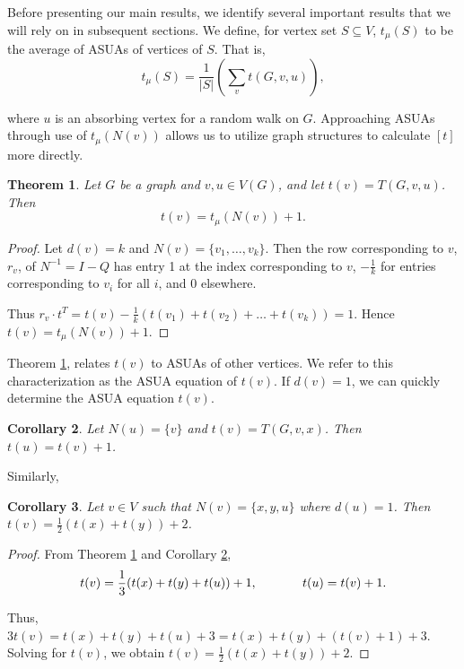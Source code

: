 \documentclass{article}
\newtheorem{theorem}{Theorem}[section]  %
\newtheorem{corollary}[theorem]{Corollary}
\theoremstyle{definition}
\begin{document}
\noindent Before presenting our main results, we identify several important results that we will rely on in subsequent sections. We define, for vertex set $S \subseteq V$, $t_{\mu}(S)$ to be the average of ASUAs of vertices of $S$. That is, 
\[t_{\mu}(S) = \dfrac{1}{|S|}\left( \sum_v t(G,v,u) \right),\]

where $u$ is an absorbing vertex for a random walk on $G$. Approaching ASUAs through use of $t_{\mu}(N(v))$ allows us to utilize graph structures to calculate $[t]$ more directly.

\begin{theorem}
\label{thm_mu}
Let $G$ be a graph and $v, u \in V(G)$, and let $t(v) = T(G,v,u)$.  Then \[t(v) = t_{\mu}(N(v)) + 1.\]
\end{theorem}

\begin{proof}
    Let $d(v) = k$ and $N(v) = \{v_1, \ldots, v_k\}$. Then the row corresponding to $v$, $r_v$, of $N^{-1} = I - Q$ has entry 1 at the index corresponding to $v$, $-\frac{1}{k}$ for entries corresponding to $v_i$ for all $i$, and 0 elsewhere. 

    Thus $r_v\cdot t^T = t(v) - \frac{1}{k}(t(v_1) + t(v_2) + \ldots + t(v_k)) = 1.$ Hence $t(v) = t_{\mu}(N(v)) + 1$.
\end{proof}

Theorem \ref{thm_mu}, relates $t(v)$ to ASUAs of other vertices. We refer to this characterization as the ASUA equation of $t(v)$. If $d(v) = 1$, we can quickly determine the ASUA equation $t(v)$.

\begin{corollary}
\label{cor_degreeone}
    Let $N(u) = \{v\}$ and $t(v) = T(G,v,x)$. Then $t(u) = t(v) + 1$.
\end{corollary}

Similarly,
\begin{corollary}
\label{cor_sd1}
    Let $v \in V$ such that $N(v) = \{x,y,u\}$ where $d(u) = 1$. Then $t(v) = \frac{1}{2}(t(x) + t(y)) + 2$.
\end{corollary}

\begin{proof}
    From Theorem \ref{thm_mu} and Corollary \ref{cor_degreeone}, 
    \[t(v) = \frac{1}{3}(t(x) + t(y) + t(u)) + 1, \text{\hspace{.5in}} t(u) = t(v) + 1.\]

Thus, $3t(v) = t(x) + t(y) + t(u) + 3 = t(x) + t(y) + (t(v) + 1) + 3$. Solving for $t(v)$, we obtain $t(v) = \frac{1}{2}(t(x) + t(y)) + 2$.
    
\end{proof}
\end{document}
